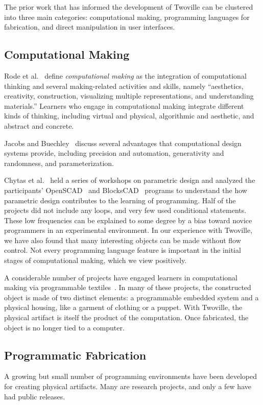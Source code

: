 \label{section:related_work}

The prior work that has informed the development of Twoville can be clustered into three main categories: computational making, programming languages for fabrication, and direct manipulation in user interfaces.

\subsection{Computational Making}
Rode et al.~\cite{rode15ctcm} define \textit{computational making} as the integration of computational thinking and several making-related activities and skills, namely ``aesthetics, creativity, construction, visualizing multiple representations, and understanding materials.'' Learners who engage in computational making integrate different kinds of thinking, including virtual and physical, algorithmic and aesthetic, and abstract and concrete.

Jacobs and Buechley~\cite{jacobs13codeable} discuss several advantages that computational design systems provide, including precision and automation, generativity and randomness, and parameterization.

Chytas et al.~\cite{chytas2018learning} held a series of workshops on parametric design and analyzed the participants' OpenSCAD~\cite{openscad} and BlocksCAD~\cite{blockscad} programs to understand the how parametric design contributes to the learning of programming. Half of the projects did not include any loops, and very few used conditional statements. These low frequencies can be explained to some degree by a bias toward novice programmers in an experimental environment. In our experience with Twoville, we have also found that many interesting objects can be made without flow control. Not every programming language feature is important in the initial stages of computational making, which we view positively.

A considerable number of projects have engaged learners in computational making via programmable textiles~\cite{rode15ctcm,buechley10lilypad,kafai14crafts}. In many of these projects, the constructed object is made of two distinct elements: a programmable embedded system and a physical housing, like a garment of clothing or a puppet. With Twoville, the physical artifact is itself the product of the computation. Once fabricated, the object is no longer tied to a computer.

\subsection{Programmatic Fabrication}
A growing but small number of programming environments have been developed for creating physical artifacts. Many are research projects, and only a few have had public releases.

